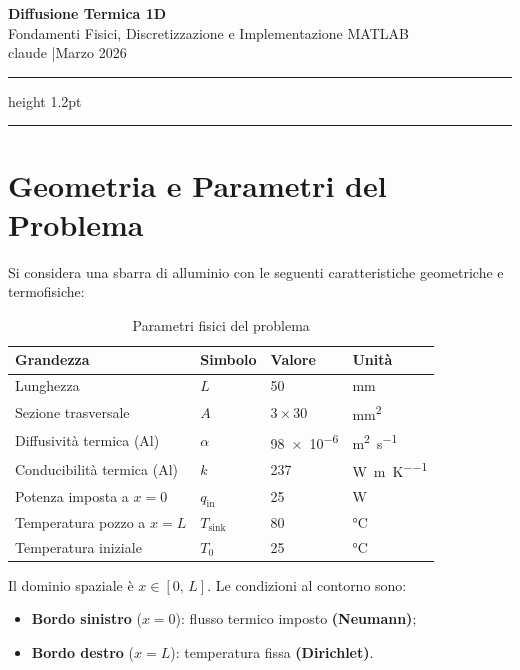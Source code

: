 \documentclass[11pt, a4paper]{article}
\begin{document}
\begin{center}
  {\LARGE\bfseries\color{myblue} Diffusione Termica 1D}\\[6pt]
  {\large Fondamenti Fisici, Discretizzazione e Implementazione MATLAB}\\[8pt]
  {\normalsize claude \quad|\quad Marzo 2026}
\end{center}

\vspace{0.5em}
\hrule height 1.2pt
\vspace{1.5em}

\tableofcontents

\vspace{1.5em}
\hrule
\newpage

\section{Geometria e Parametri del Problema}

Si considera una sbarra di alluminio con le seguenti caratteristiche geometriche e termofisiche:

\begin{table}[h!]
\centering
\caption{Parametri fisici del problema}
\begin{tabular}{llll}
\toprule
\textbf{Grandezza} & \textbf{Simbolo} & \textbf{Valore} & \textbf{Unità} \\
\midrule
Lunghezza                    & $L$       & \num{50}    & \si{\milli\meter} \\
Sezione trasversale          & $A$       & $\num{3} \times \num{30}$  & \si{\milli\meter\squared} \\
Diffusività termica (Al)     & $\alpha$  & \num{98e-6} & \si{\meter\squared\per\second} \\
Conducibilità termica (Al)   & $k$       & \num{237}   & \si{\watt\per\meter\per\kelvin} \\
Potenza imposta a $x=0$      & $q_\text{in}$ & \num{25} & \si{\watt} \\
Temperatura pozzo a $x=L$    & $T_\text{sink}$ & \num{80} & \si{\celsius} \\
Temperatura iniziale         & $T_0$     & \num{25}   & \si{\celsius} \\
\bottomrule
\end{tabular}
\end{table}

Il dominio spaziale è $x \in [0,\, L]$. Le condizioni al contorno sono:
\begin{itemize}
  \item \textbf{Bordo sinistro} ($x = 0$): flusso termico imposto \textbf{(Neumann)};
  \item \textbf{Bordo destro} ($x = L$): temperatura fissa \textbf{(Dirichlet)}.
\end{itemize}
\end{document}
